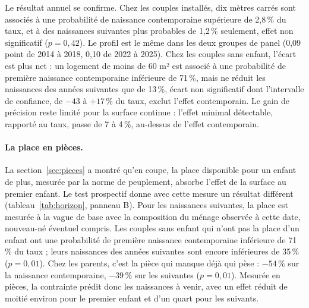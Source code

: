 \documentclass[11pt,a4paper]{article}
\theoremstyle{plain}
\theoremstyle{definition}
\theoremstyle{remark}
\begin{document}
Le résultat annuel se confirme. Chez les couples installés, dix mètres carrés sont associés à une probabilité de naissance contemporaine supérieure de 2,8\,\% du taux, et à des naissances suivantes plus probables de 1,2\,\% seulement, effet non significatif ($p = 0{,}42$). Le profil est le même dans les deux groupes de panel (0,09 point de 2014 à 2018, 0,10 de 2022 à 2025). Chez les couples sans enfant, l'écart est plus net : un logement de moins de 60 m² est associé à une probabilité de première naissance contemporaine inférieure de 71\,\%, mais ne réduit les naissances des années suivantes que de 13\,\%, écart non significatif dont l'intervalle de confiance, de $-43$ à $+17\,\%$ du taux, exclut l'effet contemporain. Le gain de précision reste limité pour la surface continue : l'effet minimal détectable, rapporté au taux, passe de 7 à 4\,\%, au-dessus de l'effet contemporain.

\paragraph{La place en pièces.} La section~\ref{sec:pieces} a montré qu'en coupe, la place disponible pour un enfant de plus, mesurée par la norme de peuplement, absorbe l'effet de la surface au premier enfant. Le test prospectif donne avec cette mesure un résultat différent (tableau~\ref{tab:horizon}, panneau B). Pour les naissances suivantes, la place est mesurée à la vague de base avec la composition du ménage observée à cette date, nouveau-né éventuel compris. Les couples sans enfant qui n'ont pas la place d'un enfant ont une probabilité de première naissance contemporaine inférieure de 71\,\% du taux ; leurs naissances des années suivantes sont encore inférieures de 35\,\% ($p = 0{,}01$). Chez les parents, c'est la pièce qui manque déjà qui pèse : $-54\,\%$ sur la naissance contemporaine, $-39\,\%$ sur les suivantes ($p = 0{,}01$). Mesurée en pièces, la contrainte prédit donc les naissances à venir, avec un effet réduit de moitié environ pour le premier enfant et d'un quart pour les suivants.
\end{document}
